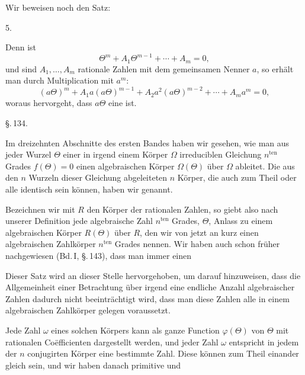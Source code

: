 
Wir beweisen noch den Satz:

5. 

Denn ist
\[
\Theta^m + A_1 \Theta^{m-1} + \cdots + A_m = 0,
\]
und sind $A_1, \ldots, A_m$ rationale Zahlen mit dem gemeinsamen Nenner $a$, so
erh\"alt man durch Multiplication mit $a^m$:
\[
(a\Theta)^m + A_1 a (a\Theta)^{m-1} + A_2 a^2 (a\Theta)^{m-2} + \cdots + A_m a^m = 0,
\]
woraus hervorgeht, dass $a\Theta$ eine  ist.

\begin{center}
\S.\,134.

\end{center}

Im dreizehnten Abschnitte des ersten Bandes haben wir gesehen, wie man aus
jeder Wurzel $\Theta$ einer in irgend einem K\"orper $\Omega$ irreduciblen
Gleichung $n^{\mathrm{ten}}$ Grades $f(\Theta) = 0$ einen algebraischen
K\"orper $\Omega(\Theta)$ \"uber $\Omega$ ableitet. Die aus den $n$ Wurzeln
dieser Gleichung abgeleiteten $n$ K\"orper, die auch zum Theil oder alle
identisch sein k\"onnen, haben wir  genannt.

Bezeichnen wir mit $R$ den K\"orper der rationalen Zahlen, so giebt also nach
unserer Definition jede algebraische Zahl $n^{\mathrm{ten}}$ Grades, $\Theta$,
Anlass zu einem algebraischen K\"orper $R(\Theta)$ \"uber $R$, den wir von
jetzt an kurz einen algebraischen Zahlk\"orper $n^{\mathrm{ten}}$
Grades nennen. Wir haben auch schon fr\"uher nachgewiesen (Bd.\,I,
\S.\,143), dass man immer einen 

Dieser Satz wird an dieser Stelle hervorgehoben, um darauf hinzuweisen, dass
die Allgemeinheit einer Betrachtung \"uber irgend eine endliche Anzahl
algebraischer Zahlen dadurch nicht beeintr\"achtigt wird, dass man diese
Zahlen alle in einem algebraischen Zahlk\"orper gelegen voraussetzt.

Jede Zahl $\omega$ eines solchen K\"orpers kann als ganze Function
$\varphi(\Theta)$ von $\Theta$ mit rationalen Co\"efficienten dargestellt
werden, und jeder Zahl $\omega$ entspricht in jedem der $n$ conjugirten
K\"orper eine bestimmte Zahl. Diese  k\"onnen zum Theil
einander gleich sein, und wir haben danach primitive und
